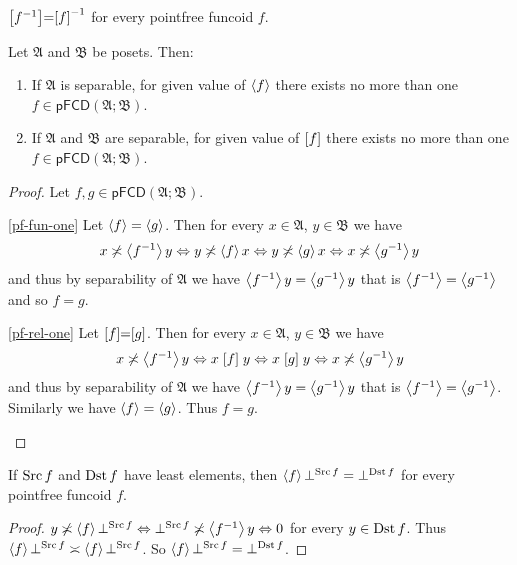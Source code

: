\begin{obvious}
$\mathrel{\left[f^{-1}\right]}=\mathrel{\left[f\right]}^{-1}$ for every pointfree funcoid $f$.\end{obvious}
\begin{thm}
\label{one-funcoid}Let $\mathfrak{A}$ and $\mathfrak{B}$ be posets.
Then:
\begin{enumerate}
\item \label{pf-fun-one}If $\mathfrak{A}$ is separable, for given value
of $\left\langle f\right\rangle$ there exists no more than one $f\in\mathsf{pFCD}(\mathfrak{A};\mathfrak{B})$.
\item \label{pf-rel-one}If $\mathfrak{A}$ and $\mathfrak{B}$ are separable,
for given value of $\mathrel{\left[f\right]}$ there exists no more than one $f\in\mathsf{pFCD}(\mathfrak{A};\mathfrak{B})$.
\end{enumerate}
\end{thm}
\begin{proof}
Let $f,g\in\mathsf{pFCD}(\mathfrak{A};\mathfrak{B})$.
\begin{widedisorder}
\item [{\ref{pf-fun-one}}] Let $\left\langle f\right\rangle=\left\langle g\right\rangle$. Then for every
$x\in\mathfrak{A}$, $y\in\mathfrak{B}$ we have
\[
x\not\asymp\left\langle f^{-1}\right\rangle y\Leftrightarrow y\not\asymp\left\langle f\right\rangle x\Leftrightarrow y\not\asymp\left\langle g\right\rangle x\Leftrightarrow x\not\asymp\left\langle g^{-1}\right\rangle y
\]
and thus by separability of $\mathfrak{A}$ we have $\left\langle f^{-1}\right\rangle y=\left\langle g^{-1}\right\rangle y$
that is $\left\langle f^{-1}\right\rangle=\left\langle g^{-1}\right\rangle$ and so $f=g$.
\item [{\ref{pf-rel-one}}] Let $\mathrel{\left[f\right]}=\mathrel{\left[g\right]}$. Then for every
$x\in\mathfrak{A}$, $y\in\mathfrak{B}$ we have
\[
x\not\asymp\left\langle f^{-1}\right\rangle y\Leftrightarrow x\mathrel{\left[f\right]}y\Leftrightarrow x\mathrel{\left[g\right]}y\Leftrightarrow x\not\asymp\left\langle g^{-1}\right\rangle y
\]
and thus by separability of $\mathfrak{A}$ we have $\left\langle f^{-1}\right\rangle y=\left\langle g^{-1}\right\rangle y$
that is $\left\langle f^{-1}\right\rangle=\left\langle g^{-1}\right\rangle$. Similarly we have $\left\langle f\right\rangle=\left\langle g\right\rangle$.
Thus $f=g$.
\end{widedisorder}
\end{proof}
\begin{prop}
\label{pfcd-zero}If $\operatorname{Src} f$ and $\operatorname{Dst} f$ have least elements,
then $\left\langle f\right\rangle\bot^{\operatorname{Src} f}=\bot^{\operatorname{Dst} f}$ for every pointfree funcoid
$f$.\end{prop}
\begin{proof}
$y\not\asymp\left\langle f\right\rangle\bot^{\operatorname{Src} f}\Leftrightarrow\bot^{\operatorname{Src} f}\not\asymp\left\langle f^{-1}\right\rangle y\Leftrightarrow0$
for every $y\in\operatorname{Dst} f$. Thus $\left\langle f\right\rangle\bot^{\operatorname{Src} f}\asymp\left\langle f\right\rangle\bot^{\operatorname{Src} f}$.
So $\left\langle f\right\rangle\bot^{\operatorname{Src} f}=\bot^{\operatorname{Dst} f}$.\end{proof}
